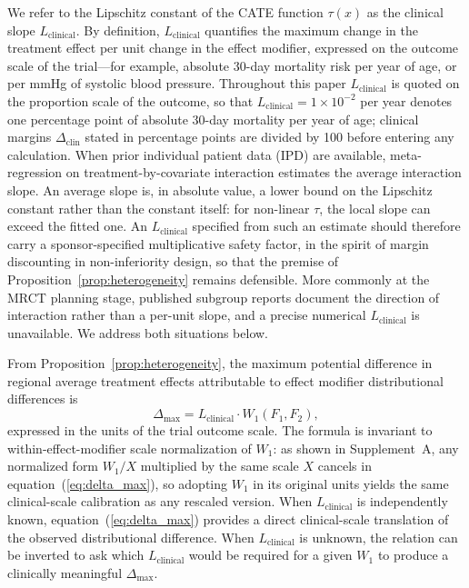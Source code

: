 \documentclass[AMA,Times1COL]{WileyNJDv5}
\begin{document}
We refer to the Lipschitz constant of the CATE function $\tau(x)$ as the clinical slope $L_{\text{clinical}}$. By definition, $L_{\text{clinical}}$ quantifies the maximum change in the treatment effect per unit change in the effect modifier, expressed on the outcome scale of the trial---for example, absolute 30-day mortality risk per year of age, or per mmHg of systolic blood pressure. Throughout this paper $L_{\text{clinical}}$ is quoted on the proportion scale of the outcome, so that $L_{\text{clinical}} = 1 \times 10^{-2}$ per year denotes one percentage point of absolute 30-day mortality per year of age; clinical margins $\Delta_{\text{clin}}$ stated in percentage points are divided by 100 before entering any calculation. When prior individual patient data (IPD) are available, meta-regression on treatment-by-covariate interaction estimates the average interaction slope.\cite{riley2010,fisher2017} An average slope is, in absolute value, a lower bound on the Lipschitz constant rather than the constant itself: for non-linear $\tau$, the local slope can exceed the fitted one. An $L_{\text{clinical}}$ specified from such an estimate should therefore carry a sponsor-specified multiplicative safety factor, in the spirit of margin discounting in non-inferiority design, so that the premise of Proposition~\ref{prop:heterogeneity} remains defensible. More commonly at the MRCT planning stage, published subgroup reports document the direction of interaction rather than a per-unit slope, and a precise numerical $L_{\text{clinical}}$ is unavailable. We address both situations below.

From Proposition~\ref{prop:heterogeneity}, the maximum potential difference in regional average treatment effects attributable to effect modifier distributional differences is
\begin{equation}
\Delta_{\max} = L_{\text{clinical}} \cdot W_1(F_1, F_2),
\label{eq:delta_max}
\end{equation}
expressed in the units of the trial outcome scale. The formula is invariant to within-effect-modifier scale normalization of $W_1$: as shown in Supplement~A, any normalized form $W_1 / X$ multiplied by the same scale $X$ cancels in equation~(\ref{eq:delta_max}), so adopting $W_1$ in its original units yields the same clinical-scale calibration as any rescaled version. When $L_{\text{clinical}}$ is independently known, equation~(\ref{eq:delta_max}) provides a direct clinical-scale translation of the observed distributional difference. When $L_{\text{clinical}}$ is unknown, the relation can be inverted to ask which $L_{\text{clinical}}$ would be required for a given $W_1$ to produce a clinically meaningful $\Delta_{\max}$.
\end{document}

